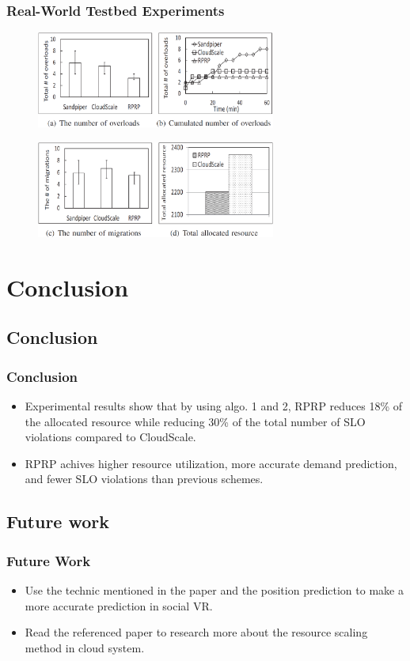\documentclass{beamer}
\begin{document}
	\begin{frame}
	\frametitle{Real-World Testbed Experiments}
		\begin{figure}[h!]
		\centering
		\includegraphics[width=0.7\textwidth]{./figure/eva3_1.PNG}
		\end{figure}
		\begin{figure}[h!]
		\centering
		\includegraphics[width=0.7\textwidth]{./figure/eva3_2.PNG}
		\end{figure}
	\end{frame}

\section{Conclusion}

\subsection{Conclusion}
	\begin{frame}
	\frametitle{Conclusion}
		\begin{itemize}
		\item Experimental results show that by using algo. 1 and 2, RPRP reduces 18\% of the allocated resource while reducing 30\% of the total number of SLO violations compared to CloudScale.
		\item RPRP achives higher resource utilization, more accurate demand prediction, and fewer SLO violations than previous schemes.
		\end{itemize}
	\end{frame}

\subsection{Future work}
	\begin{frame}
	\frametitle{Future Work}
		\begin{itemize}
		\item Use the technic mentioned in the paper and the position prediction to make a more accurate prediction in social VR.
		\item Read the referenced paper to research more about the resource scaling method in cloud system.
		\end{itemize}
	\end{frame}
\end{document}
